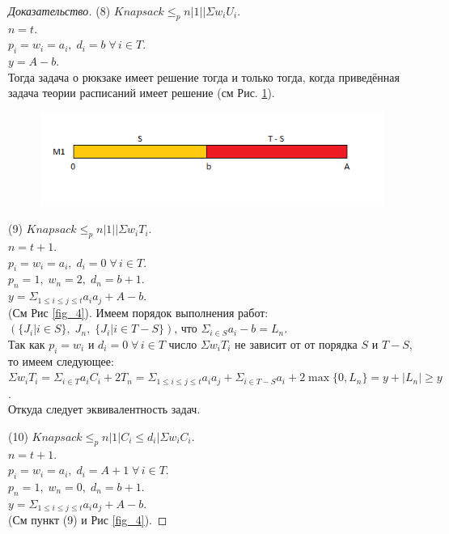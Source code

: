 \documentclass[a4paper,12pt]{article}
\theoremstyle{plain} %
\theoremstyle{definition} %
\theoremstyle{remark} %
\begin{document}
\begin{proof}[Доказательство]
	\par\bigskip
	(8) $Knapsack \le_p n|1||\Sigma w_i U_i$.\\
	$n = t$.\\
	$p_i = w_i = a_i, \; d_i = b \; \forall \, i \in T$.\\
	$y = A - b$.\\
	Тогда задача о рюкзаке имеет решение тогда и только тогда, когда приведённая задача теории расписаний имеет решение (см Рис. \ref{fig_5}).
	\begin{figure}[h!]
		\begin{center}
			\includegraphics[scale=0.65]{pic_5.png}
			\caption[]{}
			\label{fig_5}
		\end{center}
	\end{figure}
	
	\par\bigskip
	(9) $Knapsack \le_p n|1||\Sigma w_i T_i$.\\
	$n = t + 1$.\\
	$p_i = w_i = a_i, \; d_i = 0 \; \forall \, i \in T$.\\
	$p_n = 1, \; w_n = 2, \; d_n = b + 1$.\\
	$y = \Sigma_{1 \le i \le j \le t}a_i a_j + A - b$.\\
	(См Рис \ref{fig_4}). Имеем порядок выполнения работ: $(\{J_i|i \in S\}, \; J_n, \; \{J_i|i \in T - S\})$, что $\Sigma_{i \in S}a_i - b = L_n$.\\
	Так как $p_i = w_i$ и $d_i = 0 \; \forall \, i \in T$ число $\Sigma w_i T_i$ не зависит от от порядка $S$ и $T - S$, то имеем следующее:\\
	$\Sigma w_i T_i = \Sigma_{i \in T}a_i C_i + 2 T_n = \Sigma_{1 \le i \le j \le t}a_i a_j  + \Sigma_{i \in T - S}a_i + 2\max\{0, L_n\} = y + |L_n| \ge y$.\\
	Откуда следует эквивалентность задач.
	
	\par\bigskip
	(10) $Knapsack \le_p n|1|C_i \le d_i|\Sigma w_i C_i$.\\
	$n = t + 1$.\\
	$p_i = w_i = a_i, \; d_i = A + 1 \; \forall \, i \in T$.\\
	$p_n = 1, \; w_n = 0, \; d_n = b + 1$.\\
	$y = \Sigma_{1 \le i \le j \le t}a_i a_j + A - b$.\\
	(См пункт (9) и Рис \ref{fig_4}).
	
\end{proof}
\end{document}

